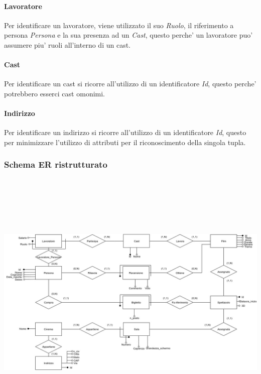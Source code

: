 \documentclass[10pt]{article}
\begin{document}
	\paragraph{Lavoratore}
	Per identificare un lavoratore, viene utilizzato il suo \textit{Ruolo}, il riferimento a persona \textit{Persona} e la sua presenza ad un \textit{Cast}, questo perche' un lavoratore puo' assumere piu' ruoli all'interno di un cast.
	\paragraph{Cast}
	Per identificare un cast si ricorre all'utilizzo di un identificatore \textit{Id}, questo perche' potrebbero esserci cast omonimi.
	\paragraph{Indirizzo}
	Per identificare un indirizzo si ricorre all'utilizzo di un identificatore \textit{Id}, questo per minimizzare l'utilizzo di attributi per il riconoscimento della singola tupla.
	\subsubsection{Schema ER ristrutturato}	
	\includegraphics[width=\textwidth, height=13cm]{Schemas/SchemaER_Rev}
\end{document}
